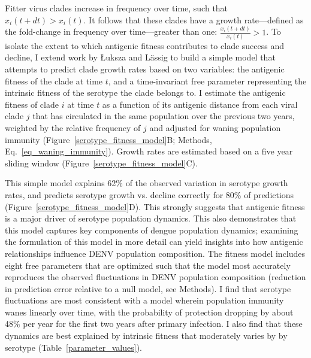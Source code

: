 Fitter virus clades increase in frequency over time, such that $x_i(t+dt) > x_i(t)$.
It follows that these clades have a growth rate---defined as the fold-change in frequency over time---greater than one: $\frac{x_i(t+dt)}{x_i(t)} > 1$.
To isolate the extent to which antigenic fitness contributes to clade success and decline, I extend work by {\L}uksza and L\"assig  \citep{luksza2014predictive} to build a simple model that attempts to predict clade growth rates based on two variables: the antigenic fitness of the clade at time $t$, and a time-invariant free parameter representing the intrinsic fitness of the serotype the clade belongs to.
I estimate the antigenic fitness of clade $i$ at time $t$ as a function of its antigenic distance from each viral clade $j$ that has circulated in the same population over the previous two years, weighted by the relative frequency of $j$ and adjusted for waning population immunity (Figure~\ref{serotype_fitness_model}B; Methods, Eq.~\ref{eq_waning_immunity}).
Growth rates are estimated based on a five year sliding window (Figure~\ref{serotype_fitness_model}C).

This simple model explains 62\% of the observed variation in serotype growth rates, and predicts serotype growth vs. decline correctly for 80\% of predictions (Figure~\ref{serotype_fitness_model}D).
This strongly suggests that antigenic fitness is a major driver of serotype population dynamics.
This also demonstrates that this model captures key components of dengue population dynamics; examining the formulation of this model in more detail can yield insights into how antigenic relationships influence DENV population composition.
The fitness model includes eight free parameters that are optimized such that the model most accurately reproduces the observed fluctuations in DENV population composition (reduction in prediction error relative to a null model, see Methods).
I find that serotype fluctuations are most consistent with a model wherein population immunity wanes linearly over time, with the probability of protection dropping by about 48\% per year for the first two years after primary infection.
I also find that these dynamics are best explained by intrinsic fitness that moderately varies by by serotype (Table~\ref{parameter_values}).

